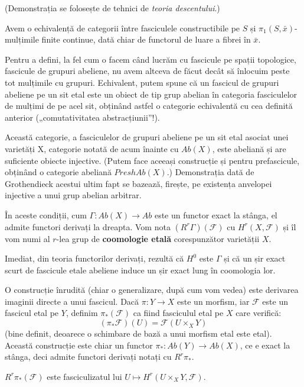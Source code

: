 \documentclass[13pt,openany]{book}
\begin{document}
(Demonstrația se folosește de tehnici de {\it teoria descentului}.)

\begin{cor}
Avem o echivalență de categorii între fasciculele constructibile pe $S$ și $\pi_1(S,\bar{x})$-mulțimile finite continue, dată chiar de functorul de luare a fibrei în $\bar{x}$.
\end{cor}

Pentru a defini, la fel cum o facem când lucrăm cu fascicule pe spații topologice, fascicule de grupuri abeliene, nu avem altceva de făcut decât să înlocuim peste tot mulțimile cu grupuri. Echivalent, putem spune că un fascicul de grupuri abeliene pe un sit etal este un obiect de tip grup abelian în categoria fasciculelor de mulțimi de pe acel sit, obținând astfel o categorie echivalentă cu cea definită anterior („comutativitatea abstracțiunii”!).

Această categorie, a fasciculelor de grupuri abeliene pe un sit etal asociat unei varietăți X, categorie notată de acum înainte cu $Ab(X)$, este abeliană și are suficiente obiecte injective. (Putem face aceeași construcție și pentru prefascicule, obținând o categorie abeliană $PreshAb(X)$.) Demonstrația dată de Grothendieck acestui ultim fapt se bazează, firește, pe existența anvelopei injective a unui grup abelian arbitrar.

În aceste condiții, cum $\Gamma: Ab(X) \rightarrow Ab$ este un functor exact la stânga, el admite functori derivați la dreapta. Vom nota $(R^r\Gamma)(\mathcal{F})$ cu $H^r(X,\mathcal{F})$ și îl vom numi al $r$-lea grup de {\bf coomologie etală} corespunzător varietății $X$.

Imediat, din teoria functorilor derivați, rezultă că $H^0$ este $\Gamma$ și că un șir exact scurt de fascicule etale abeliene induce un șir exact lung în coomologia lor.

O construcție înrudită (chiar o generalizare, după cum vom vedea) este derivarea imaginii directe a unui fascicul. Dacă $\pi: Y \rightarrow X$ este un morfism, iar $\mathcal{F}$ este un fascicul etal pe $Y$, definim $\pi_*(\mathcal{F})$ ca fiind fasciculul etal pe $X$ care verifică:
$$(\pi_*\mathcal{F})(U)=\mathcal{F}(U\times_X Y)$$
(bine definit, deoarece o schimbare de bază a unui morfism etal este etal). Această construcție este chiar un functor $\pi_*: Ab(Y) \rightarrow Ab(X)$, ce e exact la stânga, deci admite functori derivați notați cu $R^r\pi_*$.

\begin{prop}
$R^r\pi_*(\mathcal{F})$ este fasciculizatul lui $U \mapsto H^r(U \times_X Y, \mathcal{F})$.
\end{prop}
\end{document}
